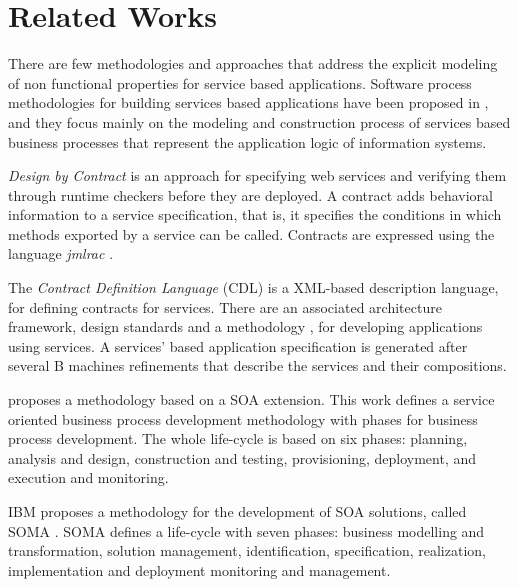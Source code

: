 \documentclass{article}
\begin{document}
\section{Related Works}  


There are
 few methodologies and approaches that address the explicit modeling  of non functional
properties for service based applications.   Software process methodologies for
building  services based applications have been proposed in \cite{PapazoglouH06,Papazoglou03,cdl2006,MilanovicM06,FeuerlichtM05,Ramollari_asurvey,somet2005}, and they focus mainly on the modeling and construction process of services based business processes that represent the application logic of information systems. 

 \textit{Design by Contract} \cite{HL05TACoS} is an approach for specifying web services and verifying them through runtime checkers before they are deployed. A contract adds behavioral information to a service specification, that is, it specifies the conditions in which methods exported by a service can be called. Contracts are expressed using the language \textit{jmlrac} \cite{LeavensCCRC02} . 
 

 The \textit{Contract Definition Language} (CDL) \cite{cdl2006} is a XML-based
description language, for defining contracts for services. There are an associated architecture framework, design standards and a
methodology \cite{MilanovicM05,Milanovic05,Milanovic06,MilanovicM06}, for developing applications using services. 
A services' based application  specification is generated after several 
B \cite{AbrialLNSS91} machines refinements that describe the services and their
compositions.

\cite{PapazoglouH06} proposes a methodology 
based on a SOA extension. This work defines a service
oriented business process development methodology with phases for business process
development. The whole life-cycle is based on six phases: planning, analysis and design,
construction and testing, provisioning, deployment, and execution
and monitoring. 

IBM proposes a methodology for the development of SOA
solutions, called SOMA \cite{soma}. SOMA defines a life-cycle with seven
phases: business modelling and transformation, solution management, identification,
specification, realization, implementation and deployment monitoring
and management.
\end{document}
